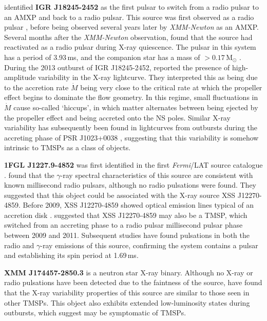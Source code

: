 \par \citealp{Papitto_Swings} identified \textbf{IGR J18245-2452} as the first pulsar to switch from a radio pulsar to an AMXP and back to a radio pulsar.  This source was first observed as a radio pulsar \citep{Manchester_PulsarCat}, before being observed several years later by \textit{XMM-Newton} \citep{Eckert_IGRJ18245} as an AMXP. Several months after the \textit{XMM-Newton} observation, \citealp{Papitto_Finding} found that the source had reactivated as a radio pulsar during X-ray quiescence. The pulsar in this system has a period of 3.93\,ms, and the companion star has a mass of $>0.17$\,M$_\odot$ \citep{Papitto_Swings}. During the 2013 outburst of IGR J18245-2452, \citealp{Ferrigno_TMSPVar} reported the presence of high-amplitude variability in the X-ray lightcurve. They interpreted this as being due to the accretion rate $\dot{M}$ being very close to the critical rate at which the propeller effect begins to dominate the flow geometry. In this regime, small fluctuations in $\dot{M}$ cause so-called `hiccups', in which matter alternates between being ejected by the propeller effect and being accreted onto the NS poles. Similar X-ray variability has subsequently been found in lightcurves from outbursts during the accreting phase of PSR J1023+0038 \citep{Bogdanov_TMSPVar}, suggesting that this variability is somehow intrinsic to TMSPs as a class of objects.
\par \textbf{1FGL J1227.9-4852} was first identified in the first \textit{Fermi}/LAT source catalogue \citep{Abdo_Catalogue}. \citealp{Hill_XSS} found that the $\gamma$-ray spectral characteristics of this source are consistent with known millisecond radio pulsars, although no radio pulsations were found. They suggested that this object could be associated with the X-ray source XSS J12270-4859. Before 2009, XSS J12270-4859 showed optical emission lines typical of an accretion disk \citep{Pretorius_Optical}. \citealp{Hill_XSS} suggested that XSS J12270-4859 may also be a TMSP, which switched from an accreting phase to a radio pulsar millisecond pulsar phase between 2009 and 2011. Subsequent studies have found pulsations in both the radio \citep{Roy_12270Spin} and $\gamma$-ray \citep{Johnson_12270Spin} emissions of this source, confirming the system contains a pulsar and establishing its spin period at 1.69\,ms.
\par \textbf{XMM J174457-2850.3} is a neutron star X-ray binary. Although no X-ray or radio pulsations have been detected due to the faintness of the source, \citealp{Degenaar_174457} have found that the X-ray variability properties of this source are similar to those seen in other TMSPs. This object also exhibits extended low-luminosity states during outbursts, which \citealp{Degenaar_174457} suggest may be symptomatic of TMSPs.
